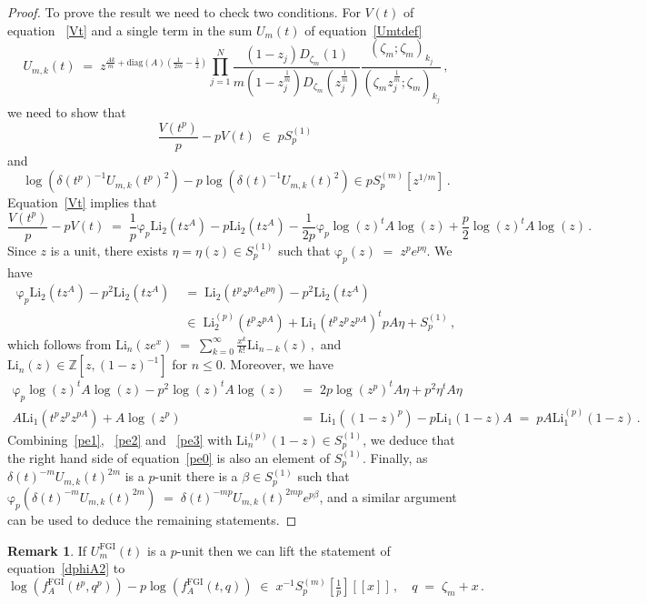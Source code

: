 \documentclass[12pt,reqno]{amsart}
\theoremstyle{definition}
\newtheorem{remark}[proposition]{Remark}
\def\BZ{\mathbb Z}
\def\Li{\mathrm{Li}}
\def\be{\begin{equation}}
\def\ee{\end{equation}}
\def\z{\zeta}
\def\diag{\mathrm{diag}}
\def\={\;=\;}
\def\inn{\;\in\;}
\def\FGI{\mathrm{FGI}}
\def\fr{\mathrm{\varphi}_p}
\def\Phitof{f}
\begin{document}
\begin{proof}
To prove the result we need to check two conditions. For $V(t)$ of equation
~\eqref{Vt} and a single term in the sum $U_{m}(t)$ of equation~\eqref{Umtdef}
\be
U_{m,k}(t) \=
z^{\frac{Ak}{m}+\diag(A)(\frac{1}{2m}-\frac{1}{2})}
\prod_{j=1}^{N}\frac{(1-z_{j})D_{\z_{m}}(1)}{m(1-z_{j}^{\frac{1}{m}})
D_{\z_{m}}(z_{j}^{\frac{1}{m}})} \frac{(\z_{m};\z_{m})_{k_j}}
{(\z_{m}z_{j}^{\frac{1}{m}};\z_{m})_{k_j}}\,,
\ee
we need to show that
\be
\label{eq:V.dwork}
\frac{V(t^p)}{p}-pV(t)
\inn pS^{(1)}_{p}\,
\ee
and
\be
\log(\delta(t^p)^{-1}U_{m,k}(t^p)^2) -p
\log(\delta(t)^{-1}U_{m,k}(t)^2) \in pS^{(m)}_{p}[z^{1/m}] \,.
\ee
Equation~\eqref{Vt} implies that
\be
\label{pe0}
\frac{V(t^p)}{p}-pV(t)
\=
\frac{1}{p}\fr\Li_{2}(tz^A)-p\Li_{2}(tz^A)
-\frac{1}{2p}\fr\log(z)^tA\log(z)+\frac{p}{2}\log(z)^tA\log(z) \,.
\ee
Since $z$ is a unit, there exists $\eta=\eta(z)\in S^{(1)}_p$ such that
$\fr(z)\=z^p e^{p \eta}$. We have
\be
\label{pe1}
\begin{aligned}
\fr\Li_{2}(tz^A)-p^2\Li_{2}(tz^A)
&\=
\Li_{2}(t^pz^{pA}e^{p\eta})-p^2\Li_{2}(tz^A)\\
&\inn
\Li_{2}^{(p)}(t^pz^{pA})
+\Li_{1}(t^pz^pz^{pA})^tpA\eta
+S^{(1)}_p\,,
\end{aligned}
\ee
which follows from $
\Li_{n}(ze^x)\=\sum_{k=0}^{\infty}\frac{x^k}{k!}\Li_{n-k}(z)\,,
$
and $\Li_{n}(z)\in\BZ[z,(1-z)^{-1}]$ for $n\leq0$. Moreover, we have
\begin{align}
\label{pe2}
\fr\log(z)^tA\log(z)-p^2\log(z)^tA\log(z)
& \=
2p\log(z^p)^tA\eta
+p^2\eta^tA\eta \\
\label{pe3}
A \Li_{1}(t^pz^pz^{pA})+ A \log(z^p)
& \=
\Li_1((1-z)^p)-p\Li_{1}(1-z)A
\=
pA \Li_{1}^{(p)}(1-z)\,.
\end{align}
Combining~\eqref{pe1}, ~\eqref{pe2} and ~\eqref{pe3} with
$\Li_{n}^{(p)}(1-z)\in S^{(1)}_{p}$, we deduce that the right hand side of
equation~\eqref{pe0} is also an element of $S^{(1)}_{p}$. Finally, as
$\delta(t)^{-m}U_{m,k}(t)^{2m}$ is a $p$-unit there is a $\beta\in S^{(1)}_p$ such that
$\fr(\delta(t)^{-m}U_{m,k}(t)^{2m})\=\delta(t)^{-mp}U_{m,k}(t)^{2mp} e^{p \beta}$, and a
similar argument can be used to deduce the remaining statements. 
\end{proof}

\begin{remark}
If $U_{m}^{\FGI}(t)$ is a $p$-unit then we can lift the statement of
equation~\eqref{dphiA2} to
\be
\log(\Phitof^{\FGI}_{A}(t^p,q^p)) -p\log(\Phitof^{\FGI}_{A}(t,q))
\inn x^{-1}S^{(m)}_p[\tfrac{1}{p}] [\![x]\!]\,,\quad
q\=\z_{m}+x\,.
\ee
\end{remark}
\end{document}
